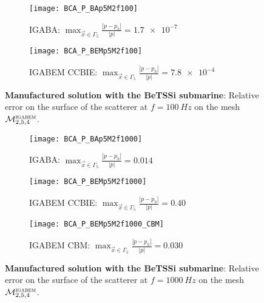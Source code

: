 \begin{figure}
	\centering
	\begin{subfigure}[t]{\textwidth}
		\texttt{[image: BCA\_P\_BAp5M2f100]}
		\caption{IGABA: $\displaystyle \max_{\vec{x}\in\Gamma_5}\frac{|p-p_h|}{|p|} = \num{1.7e-7}$}
	\end{subfigure} 
	\par\bigskip
	\begin{subfigure}[t]{\textwidth}
		\texttt{[image: BCA\_P\_BEMp5M2f100]}
		\caption{IGABEM CCBIE: $\displaystyle \max_{\vec{x}\in\Gamma_5}\frac{|p-p_h|}{|p|} = \num{7.8e-4}$}
	\end{subfigure} 
	\caption{\textbf{Manufactured solution with the BeTSSi submarine}: Relative error on the surface of the scatterer at $f=\SI{100}{Hz}$ on the mesh ${\cal M}_{2,5,4}^{\textsc{igabem}}$.}
	\label{Fig3:BCA_P_p5M2f100}
\end{figure}


\begin{figure}
	\centering
	\begin{subfigure}[t]{\textwidth}
		\texttt{[image: BCA\_P\_BAp5M2f1000]}
		\caption{IGABA: $\displaystyle \max_{\vec{x}\in\Gamma_5}\frac{|p-p_h|}{|p|} = 0.014$}
		\label{Fig3:BCA_P_p5M2f1000_BA}
	\end{subfigure} 
	\par\bigskip
	\begin{subfigure}[t]{\textwidth}
		\texttt{[image: BCA\_P\_BEMp5M2f1000]}
		\caption{IGABEM CCBIE: $\displaystyle \max_{\vec{x}\in\Gamma_5}\frac{|p-p_h|}{|p|} = 0.40$}
	\end{subfigure} 
	\par\bigskip
	\begin{subfigure}[t]{\textwidth}
		\texttt{[image: BCA\_P\_BEMp5M2f1000\_CBM]}
		\caption{IGABEM CBM: $\displaystyle \max_{\vec{x}\in\Gamma_5}\frac{|p-p_h|}{|p|} = 0.030$}
	\end{subfigure} 
	\caption{\textbf{Manufactured solution with the BeTSSi submarine}: Relative error on the surface of the scatterer at $f=\SI{1000}{Hz}$ on the mesh ${\cal M}_{2,5,4}^{\textsc{igabem}}$.}
	\label{Fig3:BCA_P_p5M2f1000}
\end{figure}

